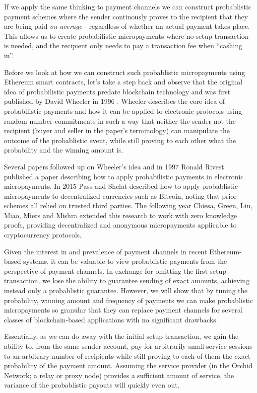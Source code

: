 If we apply the same thinking to payment channels we can construct probablistic payment schemes where the sender continously proves to the recipient that they are being paid \emph{on average} - regardless of whether an actual payment takes place. This allows us to create probabilistic micropayments where no setup transaction is needed, and the recipient only needs to pay a transaction fee when  ``cashing in''.

Before we look at how we can construct such probablistic micropayments using Ethereum smart contracts, let's take a step back and observe that the original idea of probabilistic payments predate blockchain technology and was first published by David Wheeler in 1996 \cite{txnbets}. Wheeler describes the core idea of probabilistic payments and how it can be applied to electronic protocols using random number commitments in such a way that neither the sender not the recipient (buyer and seller in the paper's terminology) can manipulate the outcome of the probablistic event, while still proving to each other what the probability and the winning amount is.

Several papers followed up on Wheeler's idea and in 1997 Ronald Rivest \cite{lotterytickets} published a paper describing how to apply probabilistic payments in electronic micropayments. In 2015 Pass and Shelat described\cite{Micropayments} how to apply probablistic micropayments to decentralized currencies such as Bitcoin, noting that prior schemes all relied on trusted third parties. The following year Chiesa, Green, Liu, Miao, Miers and Mishra extended \cite{DAM} this research to work with zero knowledge proofs, providing decentralized and anonymous micropayments applicable to cryptocurrency protocols.

Given the interest in and prevalence of payment channels in recent Ethereum-based systems, it can be valuable to view probablistic payments from the perspective of payment channels. In exchange for omitting the first setup transaction, we lose the ability to guarantee sending of exact amounts, achieving instead only a probablistic guarantee. However, we will show that by tuning the probability, winning amount and frequency of payments we can make probablistic micropayments so granular that they can replace payment channels for several classes of blockchain-based applications with no significant drawbacks.

Essentially, as we can do away with the initial setup transaction, we gain the ability to, from the same sender account, pay for arbitrarily small service sessions to an arbitrary number of recipients while still proving to each of them the exact probability of the payment amount. Assuming the service provider (in the Orchid Network; a relay or proxy node) provides a sufficient amount of service, the variance of the probablistic payouts will quickly even out.

